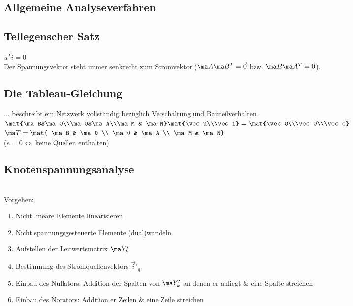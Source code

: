 \documentclass[fs, footer]{latex4ei}
\begin{document}
\begin{multicols*}{4}
\section{Allgemeine Analyseverfahren}

	\subsection{Tellegenscher Satz}
	$u^Ti = 0$\\
	Der Spannungsvektor steht immer senkrecht zum Stromvektor ($\ma A\ma B^T = \vec 0$ bzw. $\ma B\ma A^T = \vec 0$).

	\subsection{Die Tableau-Gleichung}
	... beschreibt ein Netzwerk vollständig bezüglich Verschaltung und Bauteilverhalten.\\
	$\mat{\ma B&\ma 0\\\ma 0&\ma A\\\ma M & \ma N}\mat{\vec u\\\vec i} = \mat{\vec 0\\\vec 0\\\vec e}$\qquad
	$\ma T = \mat{ \ma B & \ma 0 \\ \ma 0 & \ma A \\ \ma M & \ma N}$\\
	($e = 0 \Leftrightarrow$ keine Quellen enthalten)



	\subsection{Knotenspannungsanalyse}
\\
Vorgehen:
\begin{enumerate}\itemsep0pt
	\item Nicht lineare Elemente linearisieren
	\item Nicht spannungsgesteuerte Elemente (dual)wandeln
	\item Aufstellen der Leitwertsmatrix $\ma Y'_k$
	\item Bestimmung des Stromquellenvektors $\vec i'_q$
	\item Einbau des Nullators: Addition der Spalten von $\ma Y'_k$ an denen er anliegt \& eine Spalte streichen
	\item Einbau des Norators: Addition er Zeilen \& eine Zeile streichen


\end{enumerate}
\end{multicols*}
\end{document}
